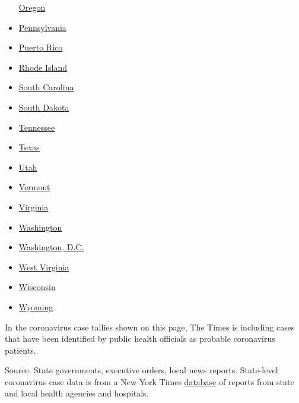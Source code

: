 \begin{itemize}
  \href{https://www.nytimes.com/interactive/2020/us/oregon-coronavirus-cases.html}{Oregon}
\item
  \href{https://www.nytimes.com/interactive/2020/us/pennsylvania-coronavirus-cases.html}{Pennsylvania}
\item
  \href{https://www.nytimes.com/interactive/2020/us/puerto-rico-coronavirus-cases.html}{Puerto
  Rico}
\item
  \href{https://www.nytimes.com/interactive/2020/us/rhode-island-coronavirus-cases.html}{Rhode
  Island}
\item
  \href{https://www.nytimes.com/interactive/2020/us/south-carolina-coronavirus-cases.html}{South
  Carolina}
\item
  \href{https://www.nytimes.com/interactive/2020/us/south-dakota-coronavirus-cases.html}{South
  Dakota}
\item
  \href{https://www.nytimes.com/interactive/2020/us/tennessee-coronavirus-cases.html}{Tennessee}
\item
  \href{https://www.nytimes.com/interactive/2020/us/texas-coronavirus-cases.html}{Texas}
\item
  \href{https://www.nytimes.com/interactive/2020/us/utah-coronavirus-cases.html}{Utah}
\item
  \href{https://www.nytimes.com/interactive/2020/us/vermont-coronavirus-cases.html}{Vermont}
\item
  \href{https://www.nytimes.com/interactive/2020/us/virginia-coronavirus-cases.html}{Virginia}
\item
  \href{https://www.nytimes.com/interactive/2020/us/washington-coronavirus-cases.html}{Washington}
\item
  \href{https://www.nytimes.com/interactive/2020/us/washington-dc-coronavirus-cases.html}{Washington,
  D.C.}
\item
  \href{https://www.nytimes.com/interactive/2020/us/west-virginia-coronavirus-cases.html}{West
  Virginia}
\item
  \href{https://www.nytimes.com/interactive/2020/us/wisconsin-coronavirus-cases.html}{Wisconsin}
\item
  \href{https://www.nytimes.com/interactive/2020/us/wyoming-coronavirus-cases.html}{Wyoming}
\end{itemize}

In the coronavirus case tallies shown on this page, The Times is
including cases that have been identified by public health officials as
probable coronavirus patients.

Source: State governments, executive orders, local news reports.
State-level coronavirus case data is from a New York Times
\href{https://www.nytimes.com/interactive/2020/us/coronavirus-us-cases.html}{database}
of reports from state and local health agencies and hospitals.

